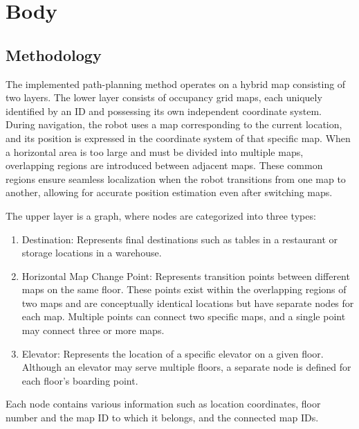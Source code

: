 \documentclass[en]{snu-cse-bsc-thesis}
\begin{document}



\chapter{Body}\label{chap:body}

\section{Methodology}\label{sec:Methodology}
The implemented path-planning method operates on a hybrid map consisting of two layers. The lower layer consists of occupancy grid maps, each uniquely identified by an ID and possessing its own independent coordinate system. During navigation, the robot uses a map corresponding to the current location, and its position is expressed in the coordinate system of that specific map. When a horizontal area is too large and must be divided into multiple maps, overlapping regions are introduced between adjacent maps. These common regions ensure seamless localization when the robot transitions from one map to another, allowing for accurate position estimation even after switching maps.

The upper layer is a graph, where nodes are categorized into three types:
\begin{enumerate}
  \item Destination: Represents final destinations such as tables in a restaurant or storage locations in a warehouse.
  \item Horizontal Map Change Point: Represents transition points between different maps on the same floor. These points exist within the overlapping regions of two maps and are conceptually identical locations but have separate nodes for each map. Multiple points can connect two specific maps, and a single point may connect three or more maps.
  \item Elevator: Represents the location of a specific elevator on a given floor. Although an elevator may serve multiple floors, a separate node is defined for each floor's boarding point.
\end{enumerate}
Each node contains various information such as location coordinates, floor number and the map ID to which it belongs, and the connected map IDs.
\end{document}
